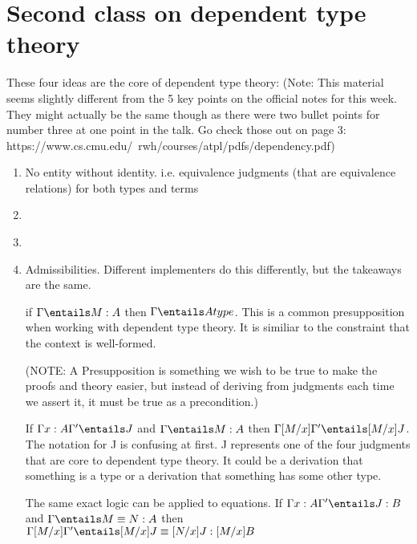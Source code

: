 \documentclass[11pt]{article}
\begin{document}
\section*{Second class on dependent type theory}
These four ideas are the core of dependent type theory: (Note: This material seems slightly different from the 5 key points on the official notes for this week. They might actually be the same though as there were two bullet points for number three at one point in the talk. Go check those out on page 3: https://www.cs.cmu.edu/~rwh/courses/atpl/pdfs/dependency.pdf)
\begin{enumerate}
    \item No entity without identity. i.e. equivalence judgments (that are equivalence relations) for both types and terms
    \item
    \begin{mathpar}
    \end{mathpar}
    \item
    \begin{mathpar}
        
    \end{mathpar}
    \item Admissibilities. Different implementers do this differently, but the takeaways are the same.

    if $\Gamma \entails M : A$ then $\Gamma \entails A type$. This is a common presupposition when working with dependent type theory. It is similiar to the constraint that the context is well-formed.

    (NOTE: A Presupposition is something we wish to be true to make the proofs and theory easier, but instead of deriving from judgments each time we assert it, it must be true as a precondition.)

    If $\Gamma x : A \Gamma' \entails J$ and $\Gamma \entails M : A$ then $\Gamma [M / x] \Gamma' \entails [M/x]J$. The notation for J is confusing at first. J represents one of the four judgments that are core to dependent type theory. It could be a derivation that something is a type or a derivation that something has some other type.

    The same exact logic can be applied to equations. If $\Gamma x : A \Gamma' \entails J : B$ and $\Gamma \entails M \equiv N : A$ then $\Gamma [M / x] \Gamma' \entails [M / x] J \equiv [N / x] J: [M/x]B$

\end{enumerate}
\end{document}
